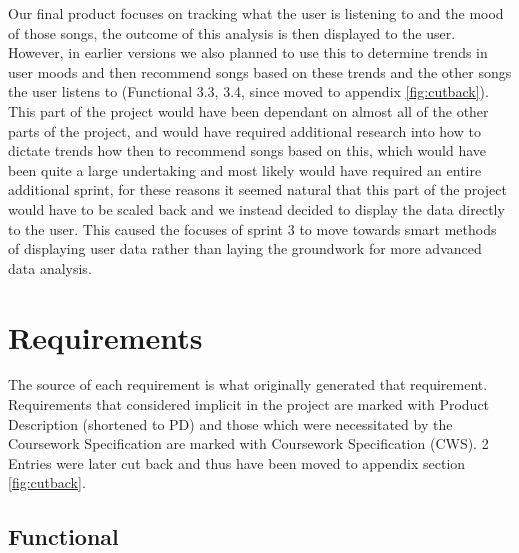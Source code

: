 \documentclass[10pt, notitlepage]{report}
\begin{document}
Our final product focuses on tracking what the user is listening to and the mood of those songs, the outcome of this analysis is then displayed to the user. However, in earlier versions we also planned to use this to determine trends in user moods and then recommend songs based on these trends and the other songs the user listens to (Functional 3.3, 3.4, since moved to appendix \ref{fig:cutback}). This part of the project would have been dependant on almost all of the other parts of the project, and would have required additional research into how to dictate trends how then to recommend songs based on this, which would have been quite a large undertaking and most likely would have required an entire additional sprint, for these reasons it seemed natural that this part of the project would have to be scaled back and we instead decided to display the data directly to the user. This caused the focuses of sprint 3 to move towards smart methods of displaying user data rather than laying the groundwork for more advanced data analysis.


\section{Requirements}

The source of each requirement is what originally generated that requirement. Requirements that considered implicit in the project are marked with Product Description (shortened to PD) and those which were necessitated by the Coursework Specification are marked with Coursework Specification (CWS). 2 Entries were later cut back and thus have been moved to appendix section \ref{fig:cutback}.

\subsection{Functional}
\end{document}
